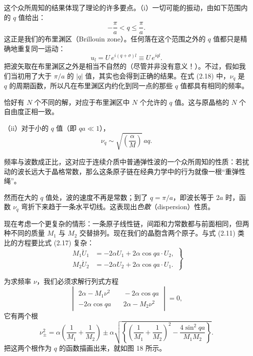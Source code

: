 这个众所周知的结果体现了理论的许多要点。（i）一切可能的振动，由如下范围内的 $q$ 值给出：
\begin{equation*}
- \frac{\pi}{a} < q \leqslant \frac{\pi}{a}.
\tag{2.19}
\end{equation*}
这正是我们的布里渊区（Brillouin zone）。任何落在这个范围之外的 $q$ 值都只是精确地重复同一运动：
\begin{equation*}
u_{l} = U\, e^{i(q+\sigma)l} \equiv U\, e^{iql}.
\tag{2.20}
\end{equation*}
把波矢取在布里渊区之外是相当不自然的（尽管并非没有意义！）。不过，假如我们当初用了大于 $\pi/a$ 的 $|q|$ 值，其实也会得到正确的结果。在式 (2.18) 中，$\nu_q$ 是 $q$ 的周期函数，所以凡在布里渊区内约化到同一点的那些 $q$ 值都具有相同的频率。

恰好有 $N$ 个不同的解，对应于布里渊区中 $N$ 个允许的 $q$ 值。这与原晶格的 $N$ 个自由度正相一致。

（ii）对于小的 $q$ 值（即 $qa \ll 1$），
\begin{equation*}
\nu_{q} \sim \sqrt{\left( \frac{\alpha}{M} \right)}\, aq.
\tag{2.21}
\end{equation*}

频率与波数成正比，这对应于连续介质中普通弹性波的一个众所周知的性质：若扰动的波长远大于晶格常数，那么这条原子链在经典力学中的行为就像一根“重弹性绳”。

然而在大的 $q$ 值处，波的速度不再是常数；到了 $q = \pi/a$，即波长等于 $2a$ 时，函数 $\nu_q$ 弯折下来趋于一条水平切线。这表现出\emph{色散}（dispersion）性质。

现在考虑一个更复杂的情形：一条原子线性链，间距和力常数都与前面相同，但两种不同的质量 $M_1$ 与 $M_2$ 交替排列。现在我们的晶胞含两个原子。与式 (2.11) 类比的方程要比式 (2.17) 复杂：
\begin{equation*}
\left.
\begin{aligned}
M_1 \ddot{U}_{1} &= - 2\alpha U_{1} + 2\alpha \cos qa \cdot U_{2}, \\
M_2 \ddot{U}_{2} &= - 2\alpha U_{2} + 2\alpha \cos qa \cdot U_{1}.
\end{aligned}
\right\}
\tag{2.22}
\end{equation*}

为求频率 $\nu$，我们必须求解行列式方程
\begin{equation*}
\begin{vmatrix}
2\alpha - M_1 \nu^2 &\quad - 2\alpha \cos qa \\
- 2\alpha \cos qa &\quad 2\alpha - M_2 \nu^2
\end{vmatrix} = 0,
\tag{2.23}
\end{equation*}
它有两个根
\begin{equation*}
\nu_{\pm}^{2} = \alpha \left( \frac{1}{M_1} + \frac{1}{M_2} \right) \pm \alpha \sqrt{\left\{ \left( \frac{1}{M_1} + \frac{1}{M_2} \right)^{2} - \frac{4 \sin^{2} qa}{M_1 M_2} \right\}}.
\tag{2.24}
\end{equation*}
把这两个根作为 $q$ 的函数描画出来，就如图 18 所示。

